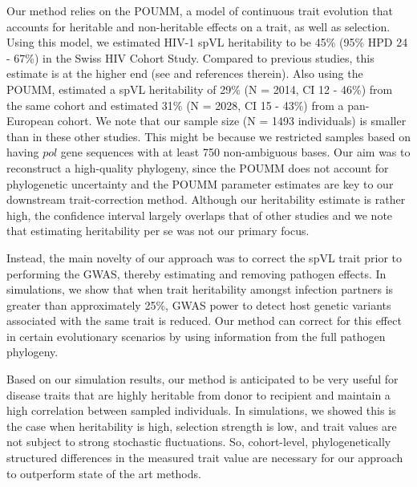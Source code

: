 \documentclass[11pt]{article}
\begin{document}
\begin{linenumbers}
Our method relies on the POUMM, a model of continuous trait evolution that accounts for heritable and non-heritable effects on a trait, as well as selection. Using this model, we estimated HIV-1 spVL heritability to be 45\% (95\% HPD 24 - 67\%) in the Swiss HIV Cohort Study. Compared to previous studies, this estimate is at the higher end (see \citet{Mitov2018} and references therein). Also using the POUMM, \citet{Bertels2018} estimated a spVL heritability of 29\% (N = 2014, CI 12 - 46\%) from the same cohort and \citet{Blanquart2017} estimated 31\% (N = 2028, CI 15 - 43\%) from a pan-European cohort. We note that our sample size (N = 1493 individuals) is smaller than in these other studies. This might be because we restricted samples based on having $pol$ gene sequences with at least 750 non-ambiguous bases. Our aim was to reconstruct a high-quality phylogeny, since the POUMM does not account for phylogenetic uncertainty and the POUMM parameter estimates are key to our downstream trait-correction method. Although our heritability estimate is rather high, the confidence interval largely overlaps that of other studies and we note that estimating heritability per se was not our primary focus.

Instead, the main novelty of our approach was to correct the spVL trait prior to performing the GWAS, thereby estimating and removing pathogen effects. In simulations, we show that when trait heritability amongst infection partners is greater than approximately 25\%, GWAS power to detect host genetic variants associated with the same trait is reduced. Our method can correct for this effect in certain evolutionary scenarios by using information from the full pathogen phylogeny. 

Based on our simulation results, our method is anticipated to be very useful for disease traits that are highly heritable from donor to recipient and  maintain a high correlation between sampled individuals. In simulations, we showed this is the case when heritability is high, selection strength is low, and trait values are not subject to strong stochastic fluctuations. So, cohort-level, phylogenetically structured differences in the measured trait value are necessary for our approach to outperform state of the art methods. 


\end{linenumbers}
\end{document}
